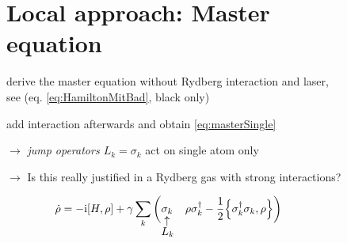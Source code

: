 \documentclass[a0,plainsections]{sciposter}
\renewcommand{\i}{\mathrm{i}} %
\begin{document}
\begin{multicols}{2}
\begin{figure}
		\section{Local approach: Master equation}
		\begin{AutoMultiColEnumerate}
			\item derive the master equation without Rydberg interaction and laser, see (eq. \ref{eq:HamiltonMitBad}, black only)
			\item add interaction afterwards \cite{nott61187} and obtain \eqref{eq:masterSingle}
			\item[\textcolor{rot}{$\rightarrow$}] \textit{jump operators $L_k=\sigma_k$} act on single atom only
			\item[\textcolor{rot}{$\rightarrow$}] \textcolor{rot}{Is this really justified in a Rydberg gas with strong interactions?}
		\end{AutoMultiColEnumerate}
		\vspace*{-2\abovedisplayskip} %
		\begin{alignat}{3}
			\dot\rho=-\i\comm{H}{\rho}+ \gamma \sum_k \bigg(& \sigma_k & \rho \sigma_k^\dagger & - \frac{1}{2}\acomm{\sigma_k^\dagger \sigma_k}{\rho}\bigg) & \label{eq:masterSingle} \\[-1.5em]\nonumber
			                                  & \uparrow &                       &                                                      &                         \\[-0.5em]\nonumber
			                                  & L_k      &                       &                                                      &
		\end{alignat}
		\vspace*{-3\belowdisplayskip} %
	\end{figure}

	\addtocounter{figure}{-2}
	\begin{figure}

\end{figure}
\end{multicols}
\end{document}
